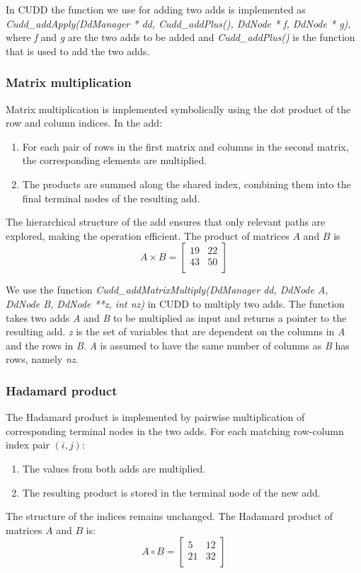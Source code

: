 In CUDD the function we use for adding two \glspl{add} is implemented as \textit{Cudd\_addApply(DdManager * dd, Cudd\_addPlus(), DdNode * f, DdNode * g)}, where \textit{f} and \textit{g} are the two \glspl{add} to be added and \textit{Cudd\_addPlus()} is the function that is used to add the two \glspl{add}.

\subsubsection{Matrix multiplication}
Matrix multiplication is implemented symbolically using the dot product of the row and column indices. In the \gls{add}:
\begin{enumerate}
    \item For each pair of rows in the first matrix and columns in the second matrix, the corresponding elements are multiplied.
    \item The products are summed along the shared index, combining them into the final terminal nodes of the resulting \gls{add}.
\end{enumerate}
The hierarchical structure of the \gls{add} ensures that only relevant paths are explored, making the operation efficient.
The product of matrices $A$ and $B$ is
\[
    A \times B = \begin{bmatrix}
        19 & 22 \\
        43 & 50 \\
    \end{bmatrix}
\]

We use the function \textit{Cudd\_addMatrixMultiply(DdManager dd, DdNode A, DdNode B, DdNode **z, int nz)} in CUDD to multiply two \glspl{add}. 
The function takes two \glspl{add} \textit{A} and \textit{B} to be multiplied as input and returns a pointer to the resulting \gls{add}.
\textit{z} is the set of variables that are dependent on the columns in \textit{A} and the rows in \textit{B}.
\textit{A} is assumed to have the same number of columns as \textit{B} has rows, namely \textit{nz}.

\subsubsection{Hadamard product}\label{subsubsec:hadamard-product}
The Hadamard product is implemented by pairwise multiplication of corresponding terminal nodes in the two \glspl{add}. For each matching row-column index pair $(i, j)$:
\begin{enumerate}
    \item The values from both \glspl{add} are multiplied.
    \item The resulting product is stored in the terminal node of the new \gls{add}.
\end{enumerate}
The structure of the indices remains unchanged.
The Hadamard product of matrices $A$ and $B$ is:
\[
    A \circ B = \begin{bmatrix}
        5  & 12 \\
        21 & 32 \\
    \end{bmatrix}
\]

